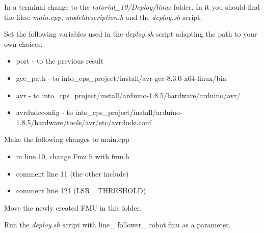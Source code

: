 \documentclass[11pt,a4paper]{../tutorial}
\begin{document}
\begin{instructions}
	
	

\item In a terminal change to the \emph{tutorial\_10/Deploy/linux} folder. In it you should find the files: \emph{main.cpp}, \emph{modeldescription.h} and the \emph{deploy.sh} script.

\item Set the following variables used in the \emph{deploy.sh} script adapting the path to your own choices:
	\begin{itemize}
		\item port - to the previous result 
		\item gcc\_path - to into\_cps\_project/install/avr-gcc-8.3.0-x64-linux/bin 
		\item avr - to into\_cps\_project/install/arduino-1.8.5/hardware/arduino/avr/ 
		\item avrdudeconfig - to into\_cps\_project/install/arduino-1.8.5/hardware/tools/avr/etc/avrdude.conf
	\end{itemize}
\item Make the following changes to main.cpp
	\begin{itemize}
		\item in line 10, change Fmu.h with fmu.h
		\item comment line 11 (the other include)
		\item comment line 121 (LSR\_ THRESHOLD)
	\end{itemize}
\item Move the newly created FMU in this folder.
\item Run the \emph{deploy.sh} script with  line\_ follower\_ robot.fmu as a parameter. 
\end{instructions}
\end{document}
